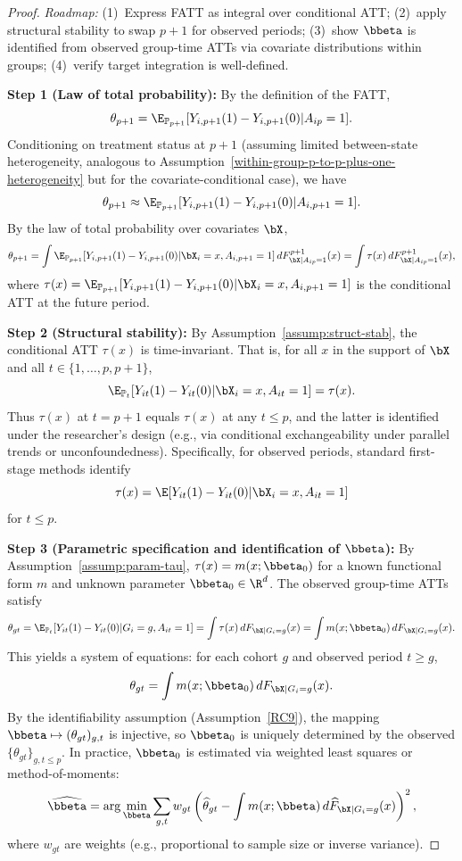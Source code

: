 \documentclass{article}
\renewcommand{\P}{\mathbb{P}}
\begin{document}
\begin{proof}
\textit{Roadmap:} (1)~Express FATT as integral over conditional ATT; (2)~apply structural stability to swap $p+1$ for observed periods; (3)~show $\bbeta$ is identified from observed group-time ATTs via covariate distributions within groups; (4)~verify target integration is well-defined.

\textbf{Step 1 (Law of total probability):} By the definition of the FATT,
\[
\theta_{p+1} = \E_{\P_{p+1}}[Y_{i,p+1}(1) - Y_{i,p+1}(0) | A_{ip} = 1].
\]
Conditioning on treatment status at $p+1$ (assuming limited between-state heterogeneity, analogous to Assumption~\ref{within-group-p-to-p-plus-one-heterogeneity} but for the covariate-conditional case), we have
\[
\theta_{p+1} \approx \E_{\P_{p+1}}[Y_{i,p+1}(1) - Y_{i,p+1}(0) | A_{i,p+1} = 1].
\]
By the law of total probability over covariates $\bX$,
\[
\theta_{p+1} = \int \E_{\P_{p+1}}[Y_{i,p+1}(1) - Y_{i,p+1}(0) | \bX_i = x, A_{i,p+1} = 1] \, dF_{\bX | A_{ip}=1}^{p+1}(x) = \int \tau(x) \, dF_{\bX | A_{ip}=1}^{p+1}(x),
\]
where $\tau(x) = \E_{\P_{p+1}}[Y_{i,p+1}(1) - Y_{i,p+1}(0) | \bX_i = x, A_{i,p+1} = 1]$ is the conditional ATT at the future period.

\textbf{Step 2 (Structural stability):} By Assumption~\ref{assump:struct-stab}, the conditional ATT $\tau(x)$ is time-invariant. That is, for all $x$ in the support of $\bX$ and all $t \in \{1,\ldots,p,p+1\}$,
\[
\E_{\P_t}[Y_{it}(1) - Y_{it}(0) | \bX_i = x, A_{it} = 1] = \tau(x).
\]
Thus $\tau(x)$ at $t = p+1$ equals $\tau(x)$ at any $t \leq p$, and the latter is identified under the researcher's design (e.g., via conditional exchangeability under parallel trends or unconfoundedness). Specifically, for observed periods, standard first-stage methods identify
\[
\tau(x) = \E[Y_{it}(1) - Y_{it}(0) | \bX_i = x, A_{it} = 1]
\]
for $t \leq p$.

\textbf{Step 3 (Parametric specification and identification of $\bbeta$):} By Assumption~\ref{assump:param-tau}, $\tau(x) = m(x;\bbeta_0)$ for a known functional form $m$ and unknown parameter $\bbeta_0 \in \R^d$. The observed group-time ATTs satisfy
\[
\theta_{gt} = \E_{\P_t}[Y_{it}(1) - Y_{it}(0) | G_i = g, A_{it} = 1] = \int \tau(x) \, dF_{\bX | G_i=g}(x) = \int m(x;\bbeta_0) \, dF_{\bX | G_i=g}(x).
\]
This yields a system of equations: for each cohort $g$ and observed period $t \geq g$,
\[
\theta_{gt} = \int m(x;\bbeta_0) \, dF_{\bX | G_i=g}(x).
\]
By the identifiability assumption (Assumption~\ref{RC9}), the mapping $\bbeta \mapsto (\theta_{gt})_{g,t}$ is injective, so $\bbeta_0$ is uniquely determined by the observed $\{\theta_{gt}\}_{g,t \leq p}$. In practice, $\bbeta_0$ is estimated via weighted least squares or method-of-moments:
\[
\widehat{\bbeta} = \arg\min_{\bbeta} \sum_{g,t} w_{gt} \left( \widehat{\theta}_{gt} - \int m(x;\bbeta) \, d\widehat{F}_{\bX | G_i=g}(x) \right)^2,
\]
where $w_{gt}$ are weights (e.g., proportional to sample size or inverse variance).


\end{proof}
\end{document}

